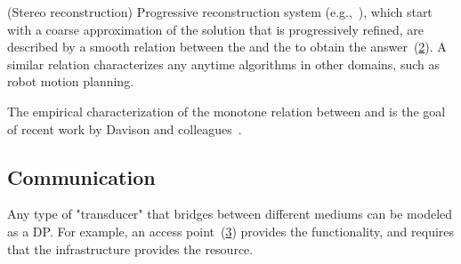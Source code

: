 \begin{figure}[h]
  \centering
  \caption{\label{fig:gmapping} }
\end{figure}



\begin{example}
  (Stereo reconstruction) Progressive reconstruction system (e.g.,~\cite{locher16progressive}),
  which start with a coarse approximation of the solution that is progressively
  refined, are described by a smooth relation between the 
  and the  to obtain the answer~(\cref{fig:progressive}).
  A similar relation characterizes any anytime algorithms in other domains,
  such as robot motion planning.
\end{example}


\begin{figure}[h]
  \centering
  \caption{\label{fig:progressive}}
\end{figure}


\begin{example}
  The empirical characterization of the monotone relation between  and 
  is the goal of recent work by Davison and colleagues~\cite{nardi15introducing,zia16comparative}.
\end{example}


\subsection{Communication}

\begin{example}[Transducers]
  Any type of "transducer" that bridges between different
  mediums can be modeled as a DP. For example, an access point~(\cref{fig:accesspoint})
  provides the  functionality, and requires
  that the infrastructure provides the  resource.
\end{example}


\begin{figure}[h]
  \centering
  \caption{\label{fig:accesspoint}}
\end{figure}

